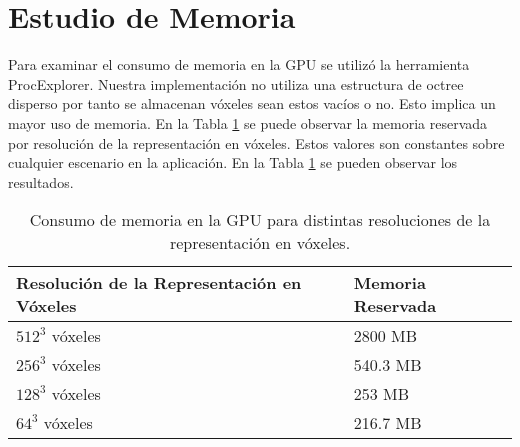 \section{Estudio de Memoria}
Para examinar el consumo de memoria en la \ac{GPU} se utilizó la herramienta ProcExplorer. Nuestra implementación no utiliza una estructura de octree disperso por tanto se almacenan vóxeles sean estos vacíos o no. Esto implica un mayor uso de memoria. En la Tabla \ref{tab:memory} se puede observar la memoria reservada por resolución de la representación en vóxeles. Estos valores son constantes sobre cualquier escenario en la aplicación. En la Tabla \ref{tab:memory} se pueden observar los resultados.
\begin{table}[H]
	\centering
	\begin{tabular}{ll}
	Resolución de la Representación en Vóxeles & Memoria Reservada             \\ \hline
	\multicolumn{1}{|l|}{$512^3$ vóxeles}                  & \multicolumn{1}{l|}{2800 MB}  \\
	\multicolumn{1}{|l|}{$256^3$ vóxeles}                  & \multicolumn{1}{l|}{540.3 MB} \\
	\multicolumn{1}{|l|}{$128^3$ vóxeles}                  & \multicolumn{1}{l|}{253 MB}   \\
	\multicolumn{1}{|l|}{$64^3$ vóxeles}                   & \multicolumn{1}{l|}{216.7 MB} \\ \hline
	\end{tabular}
	\caption{Consumo de memoria en la \ac{GPU} para distintas resoluciones de la representación en vóxeles.}
	\label{tab:memory}
\end{table}

